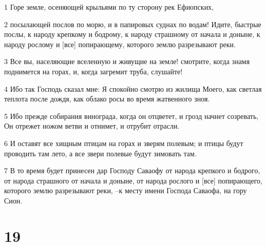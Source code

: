 \par 1 Горе земле, осеняющей крыльями по ту сторону рек Ефиопских,
\par 2 посылающей послов по морю, и в папировых суднах по водам! Идите, быстрые послы, к народу крепкому и бодрому, к народу страшному от начала и доныне, к народу рослому и [все] попирающему, которого землю разрезывают реки.
\par 3 Все вы, населяющие вселенную и живущие на земле! смотрите, когда знамя поднимется на горах, и, когда загремит труба, слушайте!
\par 4 Ибо так Господь сказал мне: Я спокойно смотрю из жилища Моего, как светлая теплота после дождя, как облако росы во время жатвенного зноя.
\par 5 Ибо прежде собирания винограда, когда он отцветет, и грозд начнет созревать, Он отрежет ножом ветви и отнимет, и отрубит отрасли.
\par 6 И оставят все хищным птицам на горах и зверям полевым; и птицы будут проводить там лето, а все звери полевые будут зимовать там.
\par 7 В то время будет принесен дар Господу Саваофу от народа крепкого и бодрого, от народа страшного от начала и доныне, от народа рослого и [все] попирающего, которого землю разрезывают реки, --к месту имени Господа Саваофа, на гору Сион.

\chapter{19}

